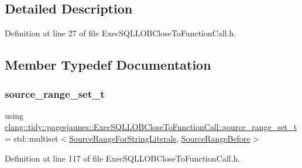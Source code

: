 \subsection{Detailed Description}


Definition at line 27 of file Exec\+S\+Q\+L\+L\+O\+B\+Close\+To\+Function\+Call.\+h.



\subsection{Member Typedef Documentation}
\mbox{\label{classclang_1_1tidy_1_1pagesjaunes_1_1_exec_s_q_l_l_o_b_close_to_function_call_aaf7dcf19c635eb42c9aec5c0d5b02444}} 
\subsubsection{\texorpdfstring{source\+\_\+range\+\_\+set\+\_\+t}{source\_range\_set\_t}}
{\footnotesize\ttfamily using \hyperlink{classclang_1_1tidy_1_1pagesjaunes_1_1_exec_s_q_l_l_o_b_close_to_function_call_aaf7dcf19c635eb42c9aec5c0d5b02444}{clang\+::tidy\+::pagesjaunes\+::\+Exec\+S\+Q\+L\+L\+O\+B\+Close\+To\+Function\+Call\+::source\+\_\+range\+\_\+set\+\_\+t} =  std\+::multiset$<$\hyperlink{classclang_1_1tidy_1_1pagesjaunes_1_1_exec_s_q_l_l_o_b_close_to_function_call_1_1_source_range_for_string_literals}{Source\+Range\+For\+String\+Literals}, \hyperlink{classclang_1_1tidy_1_1pagesjaunes_1_1_exec_s_q_l_l_o_b_close_to_function_call_1_1_source_range_before}{Source\+Range\+Before}$>$}



Definition at line 117 of file Exec\+S\+Q\+L\+L\+O\+B\+Close\+To\+Function\+Call.\+h.



